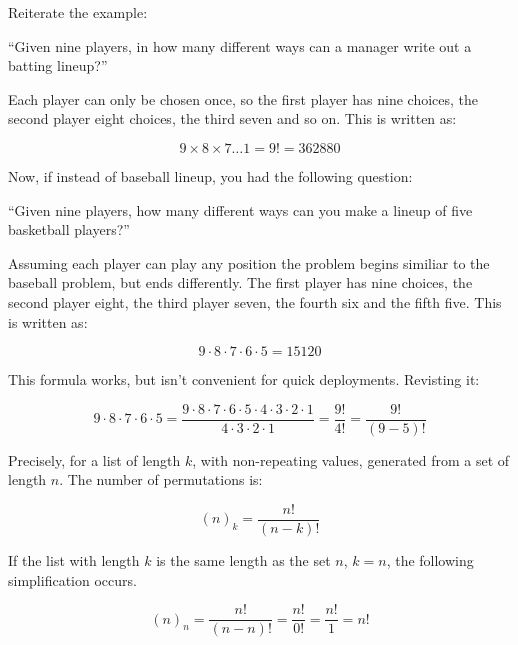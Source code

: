 \documentclass{article}
\begin{document}
Reiterate the example:

\begin{center}
    ``Given nine players, in how many different ways can a manager write out a batting lineup?''
\end{center}

Each player can only be chosen once, so the first player has nine choices, the second player eight choices, the third seven and so on. This is written as:

\begin{equation*}
    9 \times 8 \times 7 \dots 1 = 9! = 362880
\end{equation*}

Now, if instead of baseball lineup, you had the following question:

\begin{center}
    ``Given nine players, how many different ways can you make a lineup of five basketball players?''
\end{center}

Assuming each player can play any position the problem begins similiar to the baseball problem, but ends differently. The first player has nine choices, the second player eight, the third player seven, the fourth six and the fifth five. This is written as:

\begin{equation*}
    9 \cdot 8 \cdot 7 \cdot 6 \cdot 5 = 15120
\end{equation*}

This formula works, but isn't convenient for quick deployments. Revisting it:

\begin{equation*}
    9 \cdot 8 \cdot 7 \cdot 6 \cdot 5 = \dfrac{9 \cdot 8 \cdot 7 \cdot 6 \cdot 5 \cdot 4 \cdot 3 \cdot 2 \cdot 1}{4 \cdot 3 \cdot 2 \cdot 1} = \dfrac{9!}{4!} = \dfrac{9!}{(9-5)!}
\end{equation*}

Precisely, for a list of length $k$, with non-repeating values, generated from a set of length $n$. The number of permutations is:

\begin{equation*}
    (n)_{k} = \dfrac{n!}{(n-k)!}
\end{equation*}

If the list with length $k$ is the same length as the set $n$, $k = n$, the following simplification occurs.

\begin{equation*}
    (n)_{n} = \dfrac{n!}{(n-n)!} = \dfrac{n!}{0!} = \dfrac{n!}{1} = n!
\end{equation*}
\end{document}
